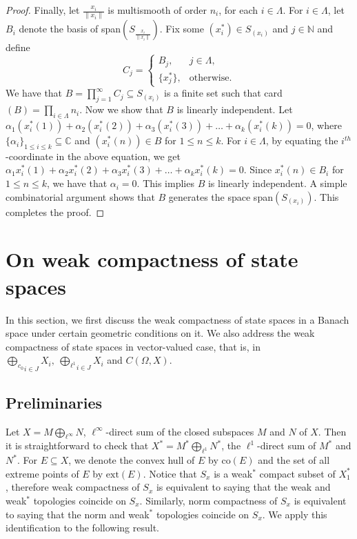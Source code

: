 \documentclass[12pt]{amsart}
\theoremstyle{definition}
\numberwithin{equation}{section}
\begin{document}
\begin{proof}
Finally, let $\frac{x_{i}}{\|x_{i}\|}$ is multismooth of order $n_{i}$, for each $i\in \Lambda$. For $i\in \Lambda$, let $B_{i}$ denote the basis of span$(S_{\frac{x_{i}}{\|x_{i}\|}})$. Fix some $(x_{i}^*)\in S_{(x_{i})}$ and $j\in \mathbb{N}$ and define 
    \[
C_{j}=
     \begin{cases}
        B_{j}, & j\in \Lambda,\\
        \{x^*_{j}\}, & \text{otherwise}.
     \end{cases}
    \]
    We have that $B=\prod_{j=1}^{\infty}C_{j}\subseteq S_{(x_{i})}$ is a finite set such that card$(B)=\prod_{i\in \Lambda} n_{i}$. Now we show that $B$ is linearly independent. Let $\alpha_{1}(x_{i}^*(1))+ \alpha_{2}(x_{i}^*(2))+\alpha_{3}(x_{i}^*(3))+\dots+\alpha_{k}(x_{i}^*(k))=0$, where $\{\alpha_{i}\}_{1\leq i\leq k}\subseteq \mathbb{C}$ and $(x_{i}^*(n))\in B$ for $1\leq n\leq k$. For $i\in \Lambda$, by equating the $i^{th}$-coordinate in the above equation, we get $\alpha_{1}x_{i}^*(1)+ \alpha_{2}x_{i}^*(2)+\alpha_{3}x_{i}^*(3)+\dots+\alpha_{k}x_{i}^*(k)=0$. Since $x_{i}^*(n)\in B_{i}$ for $1\leq n\leq k$, we have that $\alpha_{i}=0$. This implies $B$ is linearly independent. A simple combinatorial argument shows that $B$ generates the space span$(S_{(x_{i})})$. This completes the proof.
\end{proof}
\section{On weak compactness of state spaces}
In this section, we first discuss the weak compactness of state spaces in a Banach space under certain geometric conditions on it. We also address the weak compactness of state spaces in vector-valued case, that is, in ${\bigoplus_{c_{0}}}_{i\in J}{X_i},\ {\bigoplus_{\ell^1}}_{i\in J}{X_i}$ and $C(\Omega,X)$.

\subsection{Preliminaries}
 Let $X=M\bigoplus_{\ell^{\infty}} N$, $\ell^{\infty}$-direct sum of the closed subspaces $M$ and $N$ of $X$. Then it is straightforward to check that $X^*=M^*\bigoplus_{\ell^1} N^*$, the $\ell^{1}$-direct sum of $M^*$ and $N^*$. For $E\subseteq X$, we denote the convex hull of $E$ by $\text{co}(E)$ and the set of all extreme points of $E$ by $\text{ext}(E)$. Notice that $S_{x}$ is a weak$^*$ compact subset of $X^*_{1}$, therefore weak compactness of $S_{x}$ is equivalent to saying that the weak and weak$^*$ topologies coincide on $S_{x}$. Similarly, norm compactness of $S_{x}$ is equivalent to saying that the norm and weak$^*$ topologies coincide on $S_{x}$. We apply this identification to the following result.
\end{document}
